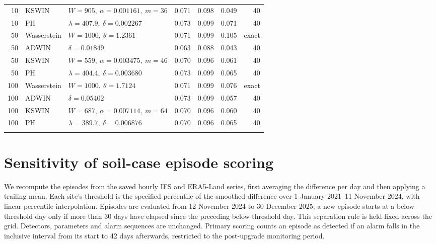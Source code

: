 \documentclass[preprint,12pt]{elsarticle}
\begin{document}
\begin{longtable}{rllrrrr}
10 & KSWIN & $W=905,\ \alpha=0.001161,\ m=36$ & 0.071 & 0.098 & 0.049 & 40 \\*
10 & PH & $\lambda=407.9,\ \delta=0.002267$ & 0.073 & 0.099 & 0.071 & 40 \\*
50 & Wasserstein & $W=1000,\ \theta=1.2361$ & 0.071 & 0.099 & 0.105 & exact \\*
50 & ADWIN & $\delta=0.01849$ & 0.063 & 0.088 & 0.043 & 40 \\*
50 & KSWIN & $W=559,\ \alpha=0.003475,\ m=46$ & 0.070 & 0.096 & 0.061 & 40 \\*
50 & PH & $\lambda=404.4,\ \delta=0.003680$ & 0.073 & 0.099 & 0.065 & 40 \\*
100 & Wasserstein & $W=1000,\ \theta=1.7124$ & 0.071 & 0.099 & 0.076 & exact \\*
100 & ADWIN & $\delta=0.05402$ & 0.073 & 0.099 & 0.057 & 40 \\*
100 & KSWIN & $W=687,\ \alpha=0.007114,\ m=64$ & 0.070 & 0.096 & 0.060 & 40 \\*
100 & PH & $\lambda=389.7,\ \delta=0.006876$ & 0.070 & 0.096 & 0.065 & 40 \\
\addlinespace
\end{longtable}\endgroup


\section{Sensitivity of soil-case episode scoring}
\label{app:soil-sensitivity}
We recompute the episodes from the saved hourly IFS and ERA5-Land series, first averaging the difference per day and then applying a trailing mean. Each site's threshold is the specified percentile of the smoothed difference over 1 January 2021--11 November 2024, with linear percentile interpolation. Episodes are evaluated from 12 November 2024 to 30 December 2025; a new episode starts at a below-threshold day only if more than 30 days have elapsed since the preceding below-threshold day. This separation rule is held fixed across the grid. Detectors, parameters and alarm sequences are unchanged. Primary scoring counts an episode as detected if an alarm falls in the inclusive interval from its start to 42 days afterwards, restricted to the post-upgrade monitoring period.
\end{document}
